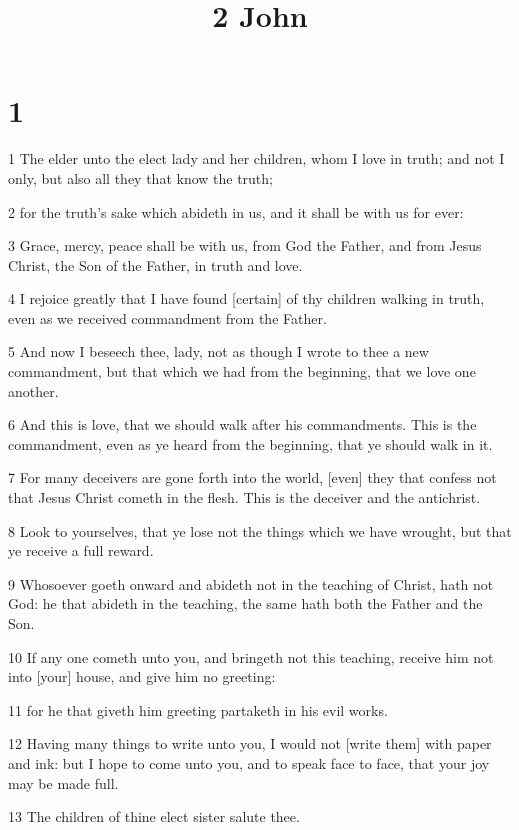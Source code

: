 

\title{2 John}

\chapter{1}

\par 1 The elder unto the elect lady and her children, whom I love in truth; and not I only, but also all they that know the truth;
\par 2 for the truth's sake which abideth in us, and it shall be with us for ever:
\par 3 Grace, mercy, peace shall be with us, from God the Father, and from Jesus Christ, the Son of the Father, in truth and love.
\par 4 I rejoice greatly that I have found [certain] of thy children walking in truth, even as we received commandment from the Father.
\par 5 And now I beseech thee, lady, not as though I wrote to thee a new commandment, but that which we had from the beginning, that we love one another.
\par 6 And this is love, that we should walk after his commandments. This is the commandment, even as ye heard from the beginning, that ye should walk in it.
\par 7 For many deceivers are gone forth into the world, [even] they that confess not that Jesus Christ cometh in the flesh. This is the deceiver and the antichrist.
\par 8 Look to yourselves, that ye lose not the things which we have wrought, but that ye receive a full reward.
\par 9 Whosoever goeth onward and abideth not in the teaching of Christ, hath not God: he that abideth in the teaching, the same hath both the Father and the Son.
\par 10 If any one cometh unto you, and bringeth not this teaching, receive him not into [your] house, and give him no greeting:
\par 11 for he that giveth him greeting partaketh in his evil works.
\par 12 Having many things to write unto you, I would not [write them] with paper and ink: but I hope to come unto you, and to speak face to face, that your joy may be made full.
\par 13 The children of thine elect sister salute thee.

